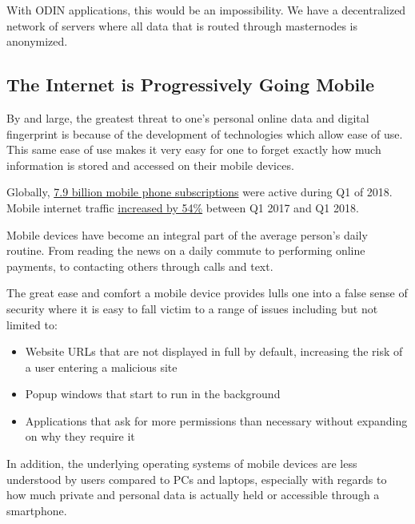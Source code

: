 \documentclass[12pt,letterpaper]{article}
\begin{document}
With ODIN applications, this would be an impossibility. We have a decentralized network of servers where all data that is routed through masternodes is anonymized.

\subsection{The Internet is Progressively Going Mobile}
By and large, the greatest threat to one's personal online data and digital fingerprint is because of the development of technologies which allow ease of use. This same ease of use makes it very easy for one to forget exactly how much information is stored and accessed on their mobile devices.

Globally, \href{https://www.ericsson.com/en/mobility-report/reports/june-2018/mobile-subscriptions-worldwide-q1-2018}{7.9 billion mobile phone subscriptions} were active during Q1 of 2018. Mobile internet traffic \href{https://www.ericsson.com/en/mobility-report/reports/june-2018/mobile-traffic-report-q1-2018}{increased by 54\%} between Q1 2017 and Q1 2018.

Mobile devices have become an integral part of the average person's daily routine. From reading the news on a daily commute to performing online payments, to contacting others through calls and text. 

The great ease and comfort a mobile device provides lulls one into a false sense of security where it is easy to fall victim to a range of issues including but not limited to:
\begin{itemize}
   \item Website URLs that are not displayed in full by default, increasing the risk of a user entering a malicious site
   \item Popup windows that start to run in the background
   \item Applications that ask for more permissions than necessary without expanding on why they require it
\end{itemize}
In addition, the underlying operating systems of mobile devices are less understood by users compared to PCs and laptops, especially with regards to how much private and personal data is actually held or accessible through a smartphone.
 
\end{document}
